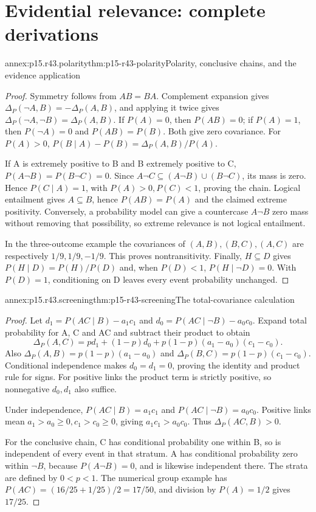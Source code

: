 \section{Evidential relevance: complete derivations}
\label{sec:p15-r43-annex}

\begin{annexitem}{annex:p15.r43.polarity}{thm:p15-r43-polarity}{Polarity, conclusive chains, and the evidence application}
\begin{proof}
Symmetry follows from \(AB=BA\). Complement expansion gives
\(\Delta_P(\neg A,B)=-\Delta_P(A,B)\), and applying it twice gives
\(\Delta_P(\neg A,\neg B)=\Delta_P(A,B)\).
If \(P(A)=0\), then \(P(AB)=0\); if \(P(A)=1\), then
\(P(\neg A)=0\) and \(P(AB)=P(B)\). Both give zero covariance.
For \(P(A)>0\),
\(P(B\mid A)-P(B)=\Delta_P(A,B)/P(A)\).

If A is extremely positive to B and B extremely positive to C,
\(P(A\neg B)=P(B\neg C)=0\). Since
\(A\neg C\subseteq(A\neg B)\cup(B\neg C)\), its mass is zero.
Hence \(P(C\mid A)=1\), with \(P(A)>0,P(C)<1\), proving the chain.
Logical entailment gives \(A\subseteq B\), hence \(P(AB)=P(A)\)
and the claimed extreme positivity. Conversely, a probability model
can give a countercase \(A\neg B\) zero mass without removing that
possibility, so extreme relevance is not logical entailment.

In the three-outcome example the covariances of \((A,B),(B,C),(A,C)\)
are respectively \(1/9,1/9,-1/9\). This proves nontransitivity.
Finally, \(H\subseteq D\) gives \(P(H\mid D)=P(H)/P(D)\) and,
when \(P(D)<1\), \(P(H\mid\neg D)=0\). With \(P(D)=1\),
conditioning on D leaves every event probability unchanged.
\end{proof}
\end{annexitem}

\begin{annexitem}{annex:p15.r43.screening}{thm:p15-r43-screening}{The total-covariance calculation}
\begin{proof}
Let \(d_1=P(AC\mid B)-a_1c_1\) and
\(d_0=P(AC\mid\neg B)-a_0c_0\). Expand total probability for A,
C and AC and subtract their product to obtain
\[
 \Delta_P(A,C)=p d_1+(1-p)d_0+p(1-p)(a_1-a_0)(c_1-c_0).
\]
Also \(\Delta_P(A,B)=p(1-p)(a_1-a_0)\) and
\(\Delta_P(B,C)=p(1-p)(c_1-c_0)\). Conditional independence makes
\(d_0=d_1=0\), proving the identity and product rule for signs.
For positive links the product term is strictly positive, so
nonnegative \(d_0,d_1\) also suffice.

Under independence, \(P(AC\mid B)=a_1c_1\) and
\(P(AC\mid\neg B)=a_0c_0\). Positive links mean
\(a_1>a_0\geq0,c_1>c_0\geq0\), giving \(a_1c_1>a_0c_0\).
Thus \(\Delta_P(AC,B)>0\).

For the conclusive chain, C has conditional probability one within B,
so is independent of every event in that stratum. A has conditional
probability zero within \(\neg B\), because \(P(A\neg B)=0\), and
is likewise independent there. The strata are defined by \(0<p<1\).
The numerical group example has \(P(AC)=(16/25+1/25)/2=17/50\),
and division by \(P(A)=1/2\) gives \(17/25\).
\end{proof}
\end{annexitem}

